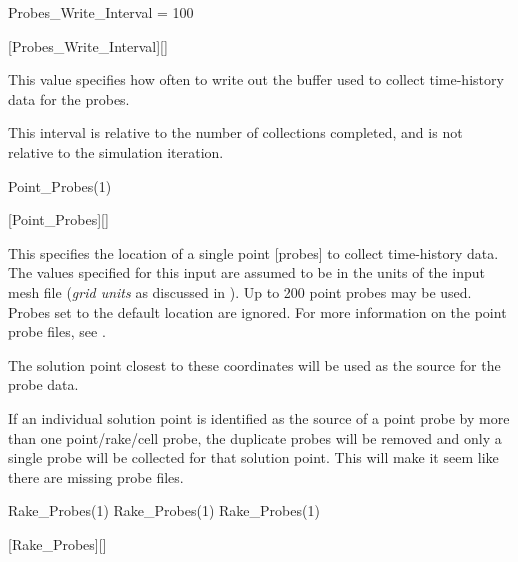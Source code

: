 
\begin{nmldescitem}
Probes_Write_Interval = 100
\end{nmldescitem}
[Probes\_Write\_Interval][]

\begin{nmldescbody}
This value specifies how often to write out the buffer used to collect
time-history data for the probes.

\NOTE
This interval is relative to the number of collections completed, and is not
relative to the simulation iteration.
\end{nmldescbody}


\begin{nmldescitem}
Point_Probes(1)%
\end{nmldescitem}
[Point\_Probes][]

\begin{nmldescbody}
This specifies the location of a single point [probes] to
collect time-history data.
%
The values specified for this input are assumed to be in the units of the input
mesh file (\thatis \emph{grid units} as discussed in ).
%
Up to 200 point probes may be used.
%
Probes set to the default location are ignored.
%
For more information on the point probe files, see
.

\NOTE
The solution point closest to these coordinates will be used as the source for
the probe data.

\NOTE
If an individual solution point is identified as the source of a point probe by
more than one point\slash rake\slash cell probe, the duplicate probes will be
removed and only a single probe will be collected for that solution point.
%
This will make it seem like there are missing probe files.
\end{nmldescbody}


\begin{nmldescitem}
Rake_Probes(1)%
Rake_Probes(1)%
Rake_Probes(1)%
\end{nmldescitem}
[Rake\_Probes][]

